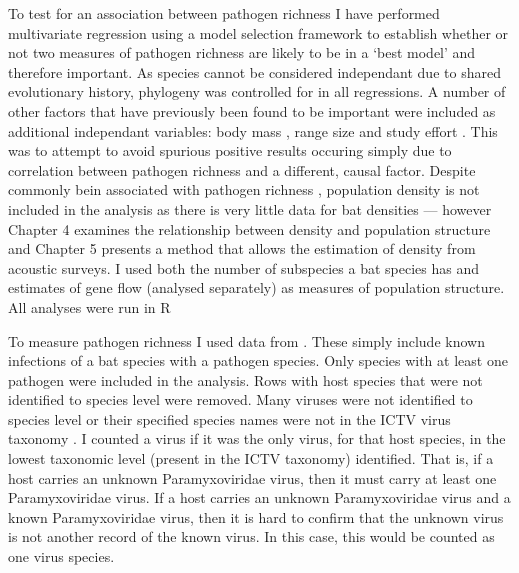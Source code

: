 To test for an association between pathogen richness I have performed multivariate regression using a model selection framework to establish whether or not two measures of pathogen richness are likely to be in a `best model' and therefore important.
As species cannot be considered independant due to shared evolutionary history, phylogeny was controlled for in all regressions.
A number of other factors that have previously been found to be important were included as additional independant variables: body mass \cite{kamiya2014determines, turmelle2009correlates, gay2014parasite, maganga2014bat}, range size \cite{kamiya2014determines, turmelle2009correlates, maganga2014bat} and study effort \cite{turmelle2009correlates, gay2014parasite, maganga2014bat}.
This was to attempt to avoid spurious positive results occuring simply due to correlation between pathogen richness and a different, causal factor.
Despite commonly bein associated with pathogen richness \cite{arneberg2002host, kamiya2014determines, nunn2003comparative}, population density is not included in the analysis as there is very little data for bat densities --- however Chapter 4 examines the relationship between density and population structure and Chapter 5 presents a method that allows the estimation of density from acoustic surveys.
I used both the number of subspecies a bat species has and estimates of gene flow (analysed separately) as measures of population structure.
All analyses were run in R \cite{R}

To measure pathogen richness I used data from \cite{luis2013comparison}. 
These simply include known infections of a bat species with a pathogen species. 
Only species with at least one pathogen were included in the analysis.
Rows with host species that were not identified to species level were removed.
Many viruses were not identified to species level or their specified species names were not in the ICTV virus taxonomy \cite{ICTV}.
I counted a virus if it was the only virus, for that host species, in the lowest taxonomic level (present in the ICTV taxonomy) identified.
That is, if a host carries an unknown Paramyxoviridae virus, then it must carry at least one Paramyxoviridae virus.
If a host carries an unknown Paramyxoviridae virus and a known Paramyxoviridae virus, then it is hard to confirm that the unknown virus is not another record of the known virus.
In this case, this would be counted as one virus species.






